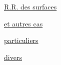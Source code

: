 
\begin{flushright}
\uline{R.R. des surfaces}

\uline{et autres cas}

\uline{particuliers}

\uline{divers}

\end{flushright}
